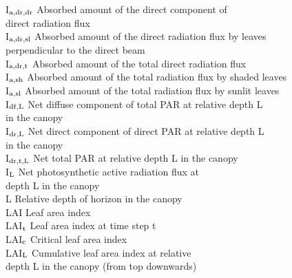 \documentclass[11pt]{article}
\begin{document}
\begin{tabbing}
I$_{{\rm a,dr,dr}}$\> \> Absorbed amount of the direct component of \\
\>\> direct radiation flux\> \> \> \> \> \> \> \> [J m$^{{\rm -2}}$ s$^{{\rm -1}}$]\\
I$_{{\rm a,dr,sl}}$\> \> Absorbed amount of the direct radiation flux by leaves\\
\>\> perpendicular to the direct beam\> \> \> \> \> \> \> \> [J m$^{{\rm -2}}$ s$^{{\rm -1}}$]\\
I$_{{\rm a,dr,t}}$\> \> Absorbed amount of the total direct radiation flux\> \> \> \> \> \> \> \> [J m$^{{\rm -2}}$ s$^{{\rm -1}}$]\\
I$_{{\rm a,sh}}$\> \> Absorbed amount of the total radiation flux by shaded leaves\> \> \> \> \> \> \> \> [J m$^{{\rm -2}}$ s$^{{\rm -1}}$]\\
I$_{{\rm a,sl}}$\> \> Absorbed amount of the total radiation flux by sunlit leaves\> \> \> \> \> \> \> \> [J m$^{{\rm -2}}$ s$^{{\rm -1}}$]\\
I$_{{\rm df,L}}$\> \> Net diffuse component of total PAR at relative depth L\\
\>\> in the canopy\> \> \> \> \> \> \> \> [J m$^{{\rm -2}}$ s$^{{\rm -1}}$]\\
I$_{{\rm dr,L}}$\> \> Net direct component of direct PAR at relative depth L\\
\>\> in the canopy\> \> \> \> \> \> \> \> [J m$^{{\rm -2}}$ s$^{{\rm -1}}$]\\
I$_{{\rm dr,t,L}}$\> \> Net total PAR at relative depth L in the canopy\> \> \> \> \> \> \> \> [J m$^{{\rm -2}}$ s$^{{\rm -1}}$]\\
I$_{{\rm L}}$\> \> Net photosynthetic active radiation flux at\\
\>\> depth L in the canopy\> \> \> \> \> \> \> \> [J m$^{{\rm -2}}$ s$^{{\rm -1}}$]\\
L\> \> Relative depth of horizon in the canopy\> \> \> \> \> \> \> \> [-]\\
LAI\> \> Leaf area index\> \> \> \> \> \> \> \> [ha ha$^{{\rm -1}}$]\\
LAI$_{{\rm t}}$\> \> Leaf area index at time step t \> \> \> \> \> \> \> \> [ha ha$^{{\rm -1}}$]\\
LAI$_{{\rm c}}$\> \> Critical leaf area index\> \> \> \> \> \> \> \> [ha ha$^{{\rm -1}}$]\\
LAI$_{{\rm L}}$\> \> Cumulative leaf area index at relative\\
\>\> depth L in the canopy (from top downwards)\> \> \> \> \> \> \> \> [ha ha$^{{\rm -1}}$]\\

\end{tabbing}
\end{document}
